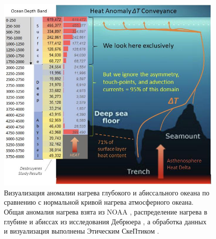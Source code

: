\documentclass[10pt,twocolumn,letterpaper]{article}
\begin{document}
\begin{figure}[t]
\begin{center}
\includegraphics[width=1\textwidth]{deepsea.jpg}
\end{center}
   \caption{Визуализация аномалии нагрева глубокого и абиссального океана по сравнению с нормальной кривой нагрева атмосферного океана. Общая аномалия нагрева взята из NOAA \cite{147}, распределение нагрева в глубине и абиссах из исследования Дебрюера \cite{132}, а обработка данных и визуализация выполнены Этическим СкеПтиком \cite{129}.}
\label{fig:21}
\end{figure}
\end{document}
